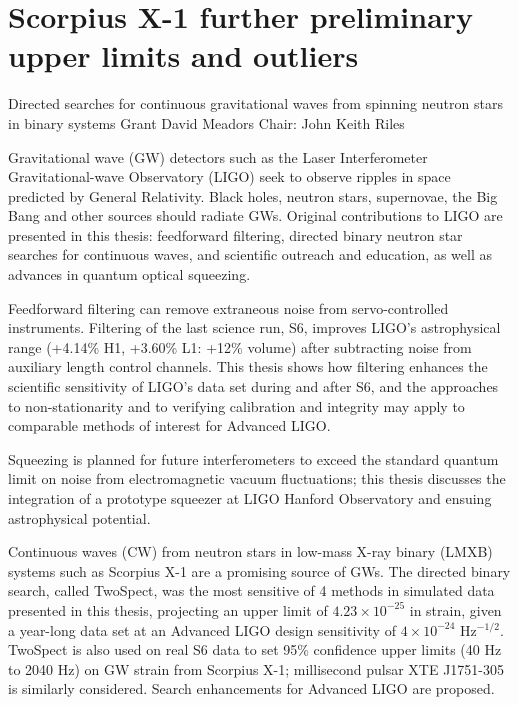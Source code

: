 \documentclass[leqno,twoside]{report}
\theoremstyle{plain}
\theoremstyle{definition}
\theoremstyle{remark}
\numberwithin{theorem}{chapter}        %
\begin{document}
\chapter{Scorpius X-1 further preliminary upper limits and outliers}
\label{appendix3}





\startabstractpage
{Directed searches for continuous gravitational waves from spinning neutron stars in binary systems } {Grant David Meadors} {Chair: John Keith Riles}

Gravitational wave (GW) detectors such as the Laser Interferometer Gravitational-wave Observatory (LIGO) seek to observe ripples in space predicted by General Relativity. 
Black holes, neutron stars, supernovae, the Big Bang and other sources should radiate GWs.
Original contributions to LIGO are presented in this thesis: feedforward filtering, directed binary neutron star searches for continuous waves, and scientific outreach and education, as well as advances in quantum optical squeezing.

Feedforward filtering can remove extraneous noise from servo-controlled instruments.
Filtering of the last science run, S6, improves LIGO's astrophysical range (+4.14\% H1, +3.60\% L1: +12\% volume) after subtracting noise from auxiliary length control channels.
This thesis shows how filtering enhances the scientific sensitivity of LIGO's data set during and after S6, and the approaches to non-stationarity and to verifying calibration and integrity may apply to comparable methods of interest for Advanced LIGO.

Squeezing is planned for future interferometers to exceed the standard quantum limit on noise from electromagnetic vacuum fluctuations; this thesis discusses the integration of a prototype squeezer at LIGO Hanford Observatory and ensuing astrophysical potential.  

Continuous waves (CW) from neutron stars in low-mass X-ray binary (LMXB) systems such as Scorpius X-1 are a promising source of GWs.
The directed binary search, called TwoSpect, was the most sensitive of 4 methods in simulated data presented in this thesis, projecting an upper limit of $4.23\times 10^{-25}$ in strain, given a year-long data set at an Advanced LIGO design sensitivity of $4\times 10^{-24}$ Hz$^{-1/2}$.
TwoSpect is also used on real S6 data to set 95\% confidence upper limits (40 Hz to 2040 Hz) on GW strain from Scorpius X-1; millisecond pulsar XTE J1751-305 is similarly considered.
Search enhancements for Advanced LIGO are proposed.
\end{document}
